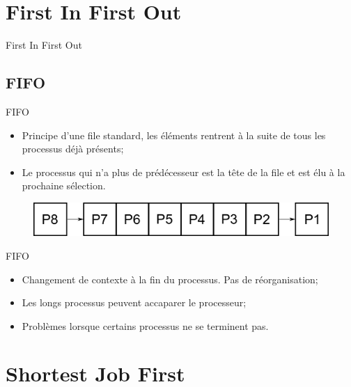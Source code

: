 \def\sectitle{First In First Out}
\section{\sectitle}

\begin{frame}{\sectitle}

\def\subsectitle{FIFO}
\subsection{\subsectitle}

\begin{block}{\subsectitle}
\begin{itemize}
    \item Principe d'une file standard, les éléments rentrent à la suite de tous
    les processus déjà présents;
    \item Le processus qui n'a plus de prédécesseur est la tête de la file et
    est élu à la prochaine sélection.
\end{itemize}
\end{block}


\begin{figure}
\includegraphics[width=\textwidth]{images/FIFO.pdf}
\end{figure}

\begin{exampleblock}{\subsectitle}
\begin{itemize}
    \item Changement de contexte à la fin du processus. Pas de réorganisation;
    \item Les longs processus peuvent accaparer le processeur;
    \item Problèmes lorsque certains processus ne se terminent pas.
\end{itemize}
\end{exampleblock}

\end{frame}


\def\sectitle{Shortest Job First}
\section{\sectitle}

